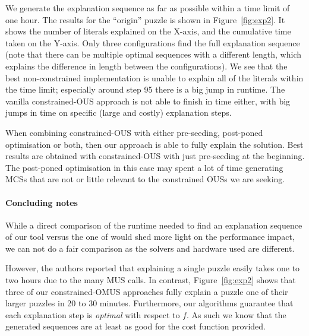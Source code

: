 {%

We generate the explanation sequence as far as possible within a time limit of one hour. 
The results for the  ``origin'' puzzle is shown in Figure~\ref{fig:exp2}.
It shows the number of literals explained on the X-axis, and the cumulative time taken on the Y-axis. 
Only three configurations find the full explanation sequence (note that there can be multiple optimal sequences with a different length, which explains the difference in length between the configurations).
We  see that the best non-constrained implementation is unable to explain all of the literals within the time limit; especially around step 95 there is a big jump in runtime. The vanilla constrained-OUS approach is not able to finish in time either, with big jumps in time on specific (large and costly) explanation steps.

When combining constrained-OUS with either pre-seeding, post-poned optimisation or both, then our approach is able to fully explain the solution. Best results are obtained with constrained-OUS with just pre-seeding at the beginning. The post-poned optimisation in this case may spent a lot of time generating MCSs that are not or little relevant to the constrained OUSs we are seeking. 

\paragraph{Concluding notes}
While a direct comparison of the runtime needed to find an explanation sequence of our tool versus the one of \citet{ecai/BogaertsGCG20} %
would shed more light on the performance impact, we can not do a fair comparison as the solvers and hardware used are different.

However, the authors reported that explaining a single puzzle easily takes one to two hours due to the many MUS calls. In contrast, Figure~\ref{fig:exp2} shows that three of our constrained-OMUS approaches fully explain a puzzle one of their larger puzzles in 20 to 30 minutes.
Furthermore, our algorithms guarantee that each explanation step is \emph{optimal} with respect to $f$. As such we know that the generated sequences are at least as good for the cost function provided.

}
